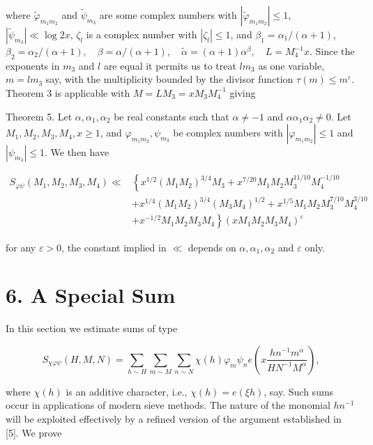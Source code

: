 \documentclass[10pt]{article}
\begin{document}
where $\tilde{\varphi}_{m_{1} m_{2}}$ and $\tilde{\psi}_{m_{3}}$ are some complex numbers with $|\tilde\varphi_{m_1m_2}|\leqslant1$, $|\tilde\psi_{m_3}|\ll\log 2x$, $\zeta_l$ is a complex number with $\left|\zeta_{l}\right| \leqslant 1$, and $\beta_{1}=\alpha_{1} /(\alpha+1)$, $\beta_{2}=\alpha_{2} /(\alpha+1), \quad \beta=\alpha /(\alpha+1), \quad \tilde{\alpha}=(\alpha+1) \alpha^{\beta}, \quad L=M_{4}^{-1} x$. Since the exponents in $m_{3}$ and $l$ are equal it permits us to treat $l m_{3}$ as one variable, $m=l m_{3}$ say, with the multiplicity bounded by the divisor function $\tau(m) \leqslant m^{\varepsilon}$. Theorem 3 is applicable with $M=L M_{3}=x M_{3} M_{4}^{-1}$ giving

Theorem 5. Let $\alpha, \alpha_{1}, \alpha_{2}$ be real constants such that $\alpha \neq -1$ and $\alpha \alpha_{1} \alpha_{2} \neq 0$. Let $M_{1}, M_{2}, M_{3}, M_{4}, x \geqslant 1$, and $\varphi_{m_{1} m_{2}}, \psi_{m_{3}}$ be complex numbers with $\left|\varphi_{m_{1} m_{2}}\right| \leqslant 1$ and $\left|\psi_{m_{3}}\right| \leqslant 1$. We then have

$$
\begin{aligned}
S_{\varphi\psi}\left(M_1,M_2,M_3,M_4\right)\ll & \left\{x^{1 / 2}\left(M_{1} M_{2}\right)^{3 / 4} M_{3}+x^{7 / 20} M_{1} M_{2} M_{3}^{11 / 10} M_{4}^{-1 / 10}\right. \\
& +x^{1 / 4}\left(M_{1} M_{2}\right)^{3 / 4}\left(M_{3} M_{4}\right)^{1 / 2}+x^{1 / 5} M_{1} M_{2} M_{3}^{7 / 10} M_{4}^{3 / 10} \\
& \left.+x^{-1 / 2} M_{1} M_{2} M_{3} M_{4}\right\}\left(x M_{1} M_{2} M_{3} M_{4}\right)^{\varepsilon}
\end{aligned}
$$

for any $\varepsilon>0$, the constant implied in $\ll$ depends on $\alpha, \alpha_{1}, \alpha_{2}$ and $\varepsilon$ only.

\section*{6. A Special Sum}
In this section we estimate sums of type

$$
S_{\chi\varphi\psi}(H, M, N)=\sum_{h \sim H} \sum_{m \sim M} \sum_{n \sim N} \chi(h) \varphi_{m} \psi_{n} e\left(x \frac{h n^{-1} m^{\alpha}}{H N^{-1} M^{\alpha}}\right),
$$

where $\chi(h)$ is an additive character, i.e., $\chi(h)=e(\xi h)$, say. Such sums occur in applications of modern sieve methods. The nature of the monomial $h n^{-1}$ will be exploited effectively by a refined version of the argument established in [5]. We prove
\end{document}
